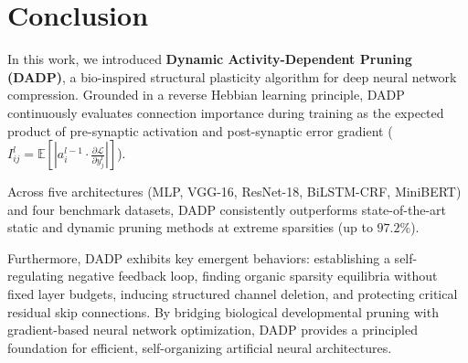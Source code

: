 \section{Conclusion}

In this work, we introduced \textbf{Dynamic Activity-Dependent Pruning (DADP)}, a bio-inspired structural plasticity algorithm for deep neural network compression. Grounded in a reverse Hebbian learning principle, DADP continuously evaluates connection importance during training as the expected product of pre-synaptic activation and post-synaptic error gradient ($I_{ij}^l = \mathbb{E}\left[\left| a_i^{l-1} \cdot \frac{\partial \mathcal{L}}{\partial y_j^l} \right|\right]$). 

Across five architectures (MLP, VGG-16, ResNet-18, BiLSTM-CRF, MiniBERT) and four benchmark datasets, DADP consistently outperforms state-of-the-art static and dynamic pruning methods at extreme sparsities (up to $97.2\%$). 

Furthermore, DADP exhibits key emergent behaviors: establishing a self-regulating negative feedback loop, finding organic sparsity equilibria without fixed layer budgets, inducing structured channel deletion, and protecting critical residual skip connections. By bridging biological developmental pruning with gradient-based neural network optimization, DADP provides a principled foundation for efficient, self-organizing artificial neural architectures.
